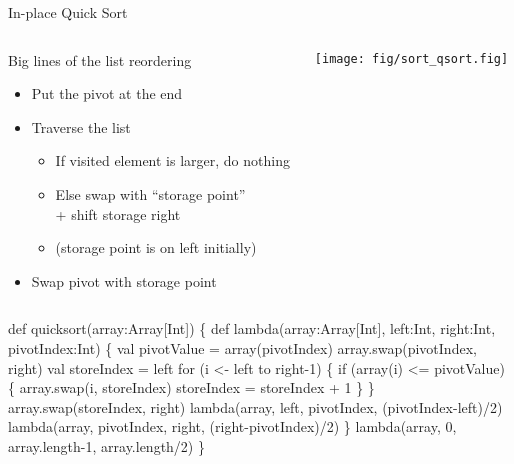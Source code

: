 \begin{frame}[fragile]{In-place Quick Sort}
  \null\vspace{-2.3\baselineskip}
  \begin{columns}
    \begin{column}{.6\linewidth}
      \begin{block}{Big lines of the list reordering}
        \begin{itemize}
        \item Put the pivot at the end
        \item Traverse the list
          \begin{itemize}
          \item If visited element is larger, do nothing
          \item Else swap with ``storage point'' \\
            + shift storage right
          \item[] (storage point is on left initially)
          \end{itemize}
        \item Swap pivot with storage point
        \end{itemize}
      \end{block}      
    \end{column}
    \begin{column}{.4\linewidth}
      \texttt{[image: fig/sort\_qsort.fig]}      
    \end{column}
  \end{columns}\vspace{-.8\baselineskip}

  \begin{center}
    \begin{boitecode}{}
def quicksort(array:Array[Int]) \{
  def lambda(array:Array[Int], left:Int, right:Int, pivotIndex:Int) \{
    val pivotValue = array(pivotIndex)
    array.swap(pivotIndex, right) 
    val storeIndex = left
    for (i <- left to right-1) \{
      if (array(i) <= pivotValue) \{
        array.swap(i, storeIndex)
        storeIndex = storeIndex + 1
    \} \}
    array.swap(storeIndex, right) 
    lambda(array, left, pivotIndex, (pivotIndex-left)/2)
    lambda(array, pivotIndex, right, (right-pivotIndex)/2)
  \}
  lambda(array, 0, array.length-1, array.length/2) \}
  \end{boitecode}
 \end{center}
\end{frame}
